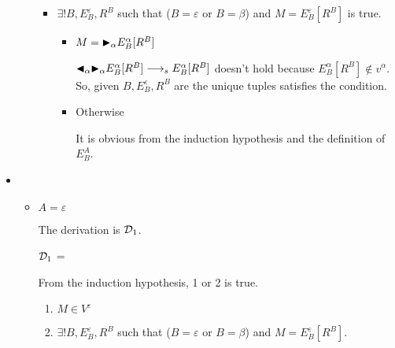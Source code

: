 \begin{itemize}
\begin{itemize}
\begin{itemize}
	      	      	\item $\exists ! B, E^\varepsilon_B, R^B$ such that ($B = \varepsilon$ or $B = \beta$) and $M = E^\varepsilon_B[R^B]$ is true.
	      	      	      	      	      	      
	      	      	      \begin{itemize}
	      	      	      	\item $ M = {\mathop{\blacktriangleright}}_\alpha E^\alpha_B[R^B] $
	      	      	      	      	      	      	      	      
	      	      	      	      $ {\mathop{\blacktriangleleft}}_\alpha {\mathop{\blacktriangleright}}_\alpha E^\alpha_B[R^B] \longrightarrow_s E^\alpha_B[R^B]$ doesn't hold because $ E^\alpha_B[R^B] \notin v^\alpha$.
	      	      	      	      So, given $B, E^\varepsilon_B, R^B$ are the unique tuples satisfies the condition.
	      	      	      	\item Otherwise
	      	      	      	      	      	      	      	      
	      	      	      	      It is obvious from the induction hypothesis and the definition of $E^A_B$.
	      	      	      \end{itemize}
	      	      \end{itemize}
	      	      	      	      
	      \end{itemize}
	      	      
	\item \TIns
	      	      
	      \begin{itemize}
	      	\item $ A = \varepsilon$
	      	      	      	      
	      	      The derivation is $\mathcal{D}_1$.
	      	      	      	      
	      	      $\mathcal{D}_1$ = 
	      	      {}
	      	      	      	      
	      	      From the induction hypothesis, 1 or 2 is true.
	      	      	      	      
	      	      \begin{enumerate}
	      	      	\item $ M \in V^\varepsilon$
	      	      	\item $\exists ! B, E^\varepsilon_B, R^B$ such that ($B = \varepsilon$ or $B = \beta$) and $M = E^\varepsilon_B[R^B]$.
	      	      \end{enumerate}
	      	      	      	      

\end{itemize}
\end{itemize}
